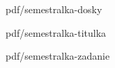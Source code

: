 \documentclass[%
  12pt,       				%
  a4paper,    				%
  oneside,      			%
	unicode,						%
]{report}				    	%
\begin{document}
\pagestyle{empty} %

%
  {pdf/semestralka-dosky}%
\vlozprazdnoustranku %
\setcounter{page}{1} %

%
  {pdf/semestralka-titulka}%
\vlozprazdnoustranku  %
   
%
  {pdf/semestralka-zadanie}%
\vlozprazdnoustranku   %

\vytvorabstrakt



\vytvorprohlaseni

\vytvorpodekovani

\obsah

\seznamobrazku

\seznamtabulek
\end{document}
